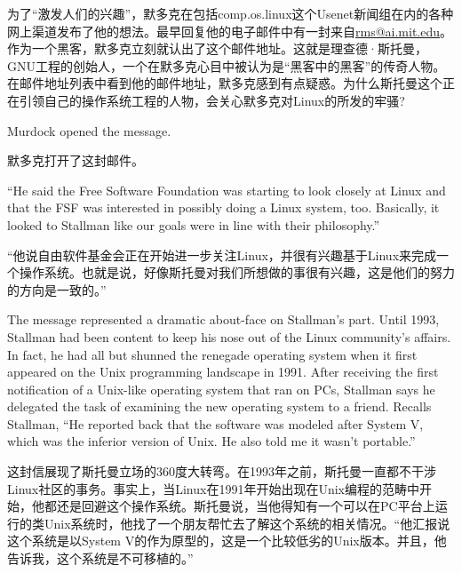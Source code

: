 \ifdefined\chs
为了``激发人们的兴趣''，默多克在包括comp.os.linux这个Usenet新闻组在内的各种网上渠道发布了他的想法。最早回复他的电子邮件中有一封来自\url{rms@ai.mit.edu}。作为一个黑客，默多克立刻就认出了这个邮件地址。这就是理查德·斯托曼，GNU工程的创始人，一个在默多克心目中被认为是``黑客中的黑客''的传奇人物。在邮件地址列表中看到他的邮件地址，默多克感到有点疑惑。为什么斯托曼这个正在引领自己的操作系统工程的人物，会关心默多克对Linux的所发的牢骚?
\fi

\ifdefined\eng
Murdock opened the message.
\fi

\ifdefined\chs
默多克打开了这封邮件。
\fi

\ifdefined\eng
``He said the Free Software Foundation was starting to look closely at Linux and that the FSF was interested in possibly doing a Linux system, too. Basically, it looked to Stallman like our goals were in line with their philosophy.''
\fi

\ifdefined\chs
``他说自由软件基金会正在开始进一步关注Linux，并很有兴趣基于Linux来完成一个操作系统。也就是说，好像斯托曼对我们所想做的事很有兴趣，这是他们的努力的方向是一致的。''
\fi

\ifdefined\eng
The message represented a dramatic about-face on Stallman's part. Until 1993, Stallman had been content to keep his nose out of the Linux community's affairs. In fact, he had all but shunned the renegade operating system when it first appeared on the Unix programming landscape in 1991. After receiving the first notification of a Unix-like operating system that ran on PCs, Stallman says he delegated the task of examining the new operating system to a friend. Recalls Stallman, ``He reported back that the software was modeled after System V, which was the inferior version of Unix. He also told me it wasn't portable.''
\fi

\ifdefined\chs
这封信展现了斯托曼立场的360度大转弯。在1993年之前，斯托曼一直都不干涉Linux社区的事务。事实上，当Linux在1991年开始出现在Unix编程的范畴中开始，他都还是回避这个操作系统。斯托曼说，当他得知有一个可以在PC平台上运行的类Unix系统时，他找了一个朋友帮忙去了解这个系统的相关情况。``他汇报说这个系统是以System V的作为原型的，这是一个比较低劣的Unix版本。并且，他告诉我，这个系统是不可移植的。''
\fi


